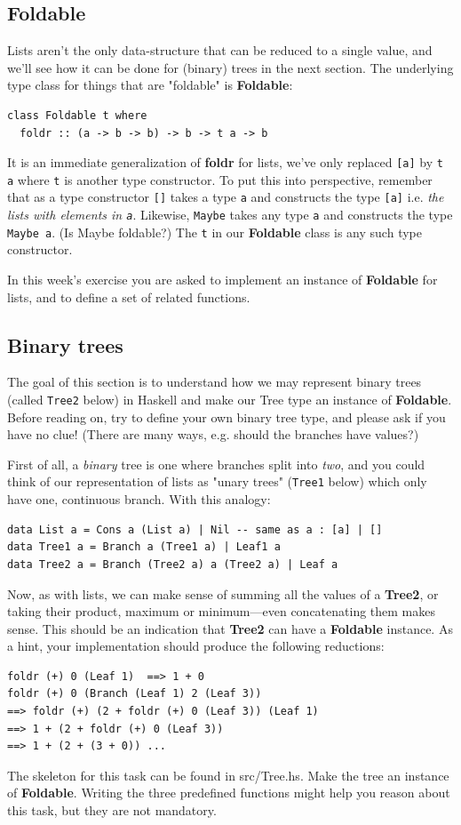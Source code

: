 \documentclass{article}
\begin{document}
\subsection{Foldable}
Lists aren't the only data-structure that can be reduced to a single value, and we'll see how it can be done for (binary) trees in the next section. The underlying type class for things that are "foldable" is \textbf{Foldable}:
\begin{lstlisting}
class Foldable t where
  foldr :: (a -> b -> b) -> b -> t a -> b
\end{lstlisting}
It is an immediate generalization of \textbf{foldr} for lists, we've only replaced \texttt{[a]} by \texttt{t a} where \texttt{t} is another type constructor. To put this into perspective, remember that as a type constructor \texttt{[]} takes a type \texttt{a} and constructs the type \texttt{[a]} i.e. \emph{the lists with elements in \texttt{a}}. Likewise, \texttt{Maybe} takes any type \texttt{a} and constructs the type \texttt{Maybe a}. (Is Maybe foldable?) The \texttt{t} in our \textbf{Foldable} class is any such type constructor.

In this week's exercise you are asked to implement an instance of \textbf{Foldable} for lists, and to define a set of related functions.

\subsection{Binary trees}
The goal of this section is to understand how we may represent binary trees (called \texttt{Tree2} below) in Haskell and make our Tree type an instance of \textbf{Foldable}. Before reading on, try to define your own binary tree type, and please ask if you have no clue! (There are many ways, e.g. should the branches have values?)

First of all, a \emph{binary} tree is one where branches split into \emph{two}, and you could think of our representation of lists as "unary trees" (\texttt{Tree1} below) which only have one, continuous branch. With this analogy:
\begin{lstlisting}
data List a = Cons a (List a) | Nil -- same as a : [a] | []
data Tree1 a = Branch a (Tree1 a) | Leaf1 a
data Tree2 a = Branch (Tree2 a) a (Tree2 a) | Leaf a
\end{lstlisting}
Now, as with lists, we can make sense of summing all the values of a \textbf{Tree2}, or taking their product, maximum or minimum---even concatenating them makes sense. This should be an indication that \textbf{Tree2} can have a \textbf{Foldable} instance. As a hint, your implementation should produce the following reductions:
\begin{lstlisting}
foldr (+) 0 (Leaf 1)  ==> 1 + 0
foldr (+) 0 (Branch (Leaf 1) 2 (Leaf 3))
==> foldr (+) (2 + foldr (+) 0 (Leaf 3)) (Leaf 1)
==> 1 + (2 + foldr (+) 0 (Leaf 3))
==> 1 + (2 + (3 + 0)) ...
\end{lstlisting}
The skeleton for this task can be found in src/Tree.hs. Make the tree an instance of \textbf{Foldable}. Writing the three predefined functions might help you reason about this task, but they are not mandatory.
\end{document}
